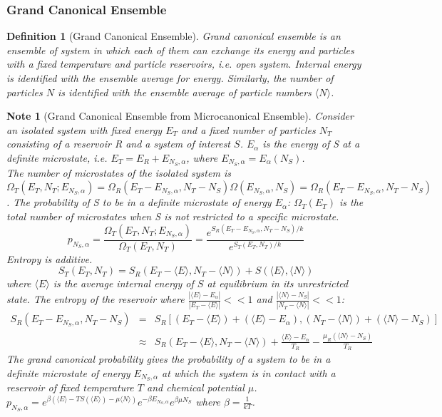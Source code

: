 \documentclass[a4paper]{article}
\newtheorem{defi}{Definition}[section]
\newtheorem{note}{Note}[section]
\theoremstyle{new}
\begin{document}
\subsubsection*{Grand Canonical Ensemble}
\begin{defi}[Grand Canonical Ensemble]
Grand canonical ensemble is an ensemble of system in which each of them can exchange its energy and particles with a fixed temperature and particle reservoirs, i.e. open system. Internal energy is identified with the ensemble average for energy. Similarly, the number of particles $N$ is identified with the ensemble average of particle numbers $\langle N\rangle$.
\end{defi}
\begin{note}[Grand Canonical Ensemble from Microcanonical Ensemble]
Consider an isolated system with fixed energy $E_T$ and a fixed number of particles $N_T$ consisting of a reservoir R and a system of interest $S$. $E_\alpha$ is the energy of S at a definite microstate, i.e. $E_T=E_R+E_{N_S,\alpha}$, where $E_{N_S,\alpha}=E_\alpha(N_S)$.\\[5pt]
The number of microstates of the isolated system is $\Omega_T(E_T,N_T;E_{N_S,\alpha})=\Omega_R(E_T-E_{N_S,\alpha},N_T-N_S)\Omega(E_{N_S,\alpha},N_S)=\Omega_R(E_T-E_{N_S,\alpha},N_T-N_S)$. The probability of S to be in a definite microstate of energy $E_\alpha$: $\Omega_T(E_T)$ is the total number of microstates when S is not restricted to a specific microstate.
$$p_{N_S,\alpha}=\frac{\Omega_T(E_T,N_T;E_{N_S,\alpha})}{\Omega_T(E_T,N_T)}=\frac{e^{S_R(E_T-E_{N_S,\alpha},N_T-N_S)/k}}{e^{S_T(E_T,N_T)/k}}$$
Entropy is additive. 
$$S_T(E_T,N_T)=S_R(E_T-\langle E\rangle,N_T-\langle N\rangle)+S(\langle E\rangle,\langle N\rangle)$$
where $\langle E\rangle$ is the average internal energy of $S$ at equilibrium in its unrestricted state. The entropy of the reservoir where $\frac{|\langle E\rangle-E_\alpha|}{|E_T-\langle E\rangle|}<<1$ and $\frac{|\langle N\rangle-N_S|}{|N_T-\langle N\rangle|}<<1$:
\begin{eqnarray}
S_R(E_T-E_{N_S,\alpha},N_T-N_S)&=&S_R[(E_T-\langle E\rangle)+(\langle E\rangle-E_\alpha),(N_T-\langle N\rangle)+(\langle N\rangle-N_S)]\nonumber\\&\approx&S_R(E_T-\langle E\rangle,N_T-\langle N\rangle)+\frac{\langle E\rangle-E_\alpha}{T_R}-\frac{\mu_R(\langle N\rangle-N_S)}{T_R}\nonumber
\end{eqnarray}
The grand canonical probability gives the probability of a system to be in a definite microstate of energy $E_{N_S,\alpha}$ at which the system is in contact with a reservoir of fixed temperature $T$ and chemical potential $\mu$. $p_{N_S,\alpha}=e^{\beta(\langle E\rangle-TS(\langle E\rangle)-\mu\langle N\rangle)}e^{-\beta E_{N_S,\alpha}}e^{\beta\mu N_S}$ where $\beta=\frac{1}{kT}$.
\end{note}
\end{document}
